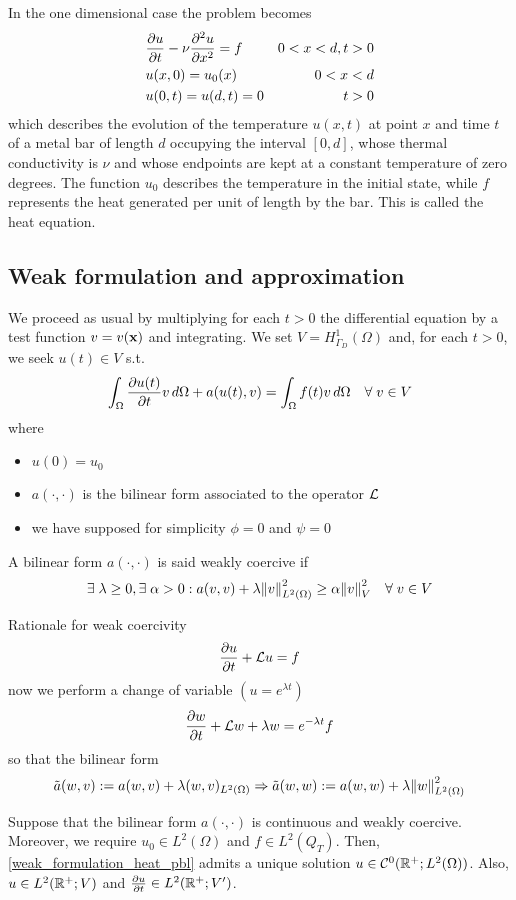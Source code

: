 In the one dimensional case the problem becomes 
\begin{equation}
    \begin{aligned}
        &\partialderivative{u}{t} - \nu \partialderivative{^2u}{x^2} = f & 0 < x <d, t> 0 \\
        &u(x,0) = u_0(x) & 0 < x < d \\
        & u(0,t) = u(d,t) = 0 & t>0
    \end{aligned}
    \label{one_dim_pbl}
\end{equation}
which describes the evolution of the temperature \(u(x,t)\) at point \(x\) and time \(t\) of a metal bar of length \(d\) occupying the interval \([0,d]\), whose thermal conductivity is \(\nu\) and whose endpoints are kept at a constant temperature of zero degrees. The function \(u_0\) describes the temperature in the initial state, while \(f\) represents the heat generated per unit of length by the bar. This is called the heat equation.
\subsection{Weak formulation and approximation}
We proceed as usual by multiplying for each \(t>0\) the differential equation by a test function \(v = v(\textbf{x})\) and integrating. We set \(V = H^1_{\Gamma_D}(\Omega)\) and, for each \(t>0\), we seek \(u(t)\in V\) s.t. 
\begin{equation}
    \int_{\Omega} \partialderivative{u(t)}{t} v \, d\Omega + a(u(t), v) = \int_\Omega f(t)v \, d\Omega \quad \forall \; v \in V 
    \label{weak_formulation_heat_pbl}
\end{equation}
where 
\begin{itemize}
    \item \(u(0) = u_0\)
    \item \(a(\cdot,\cdot)\) is the bilinear form associated to the operator \(\mathcal{L}\)
    \item we have supposed for simplicity \(\phi=0\) and \(\psi=0\)
\end{itemize}
\begin{definition}
    A bilinear form \(a(\cdot, \cdot)\) is said weakly coercive if 
    \[
        \exists \; \lambda \geq 0, \exists \; \alpha > 0 : a(v,v) + \lambda \norm{v}^2_{L^2(\Omega)} \geq \alpha \norm{v}^2_V \quad \forall \; v \in V
    \]
\end{definition}
Rationale for weak coercivity 
\[
    \partialderivative{u}{t} +\loperator u = f 
\]
now we perform a change of variable \((u = e^{\lambda t})\)
\[
    \partialderivative{w}{t} + \loperator w + \lambda w = e^{-\lambda t} f
\]
so that the bilinear form 
\[
    \tilde{a}(w,v) := a(w,v)+\lambda(w,v)_{L^2(\Omega)} \Rightarrow \tilde{a}(w,w) := a(w,w) + \lambda \norm{w}_{L^2(\Omega)}^2
\]
\begin{theorem}
    Suppose that the bilinear form \(a(\cdot,\cdot)\) is continuous and weakly coercive. Moreover, we require \(u_0 \in L^2(\Omega)\) and \(f \in L^2(Q_T)\). Then, \eqref{weak_formulation_heat_pbl} admits a unique solution \(u \in \mathcal{C}^0 (\mathbb{R}^+;L^2(\Omega))\). Also, \(u \in L^2(\mathbb{R}^+;V)\) and \(\partialderivative{u}{t} \in L^2(\real^+; V')\).
\end{theorem}
